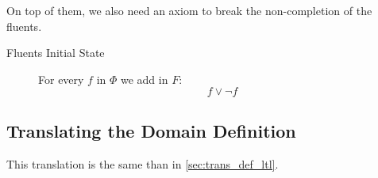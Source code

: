 On top of them, we also need an axiom to break the non-completion of the fluents.

\begin{description}
  \item[Fluents Initial State]
  For every $f$ in $\Phi$ we add in $F$:
  \begin{equation}\tag{$A.3$}
    f \lor \neg f
  \end{equation}
\end{description}

\subsection{Translating the Domain Definition}

This translation is the same than in \ref{sec:trans_def_ltl}.


